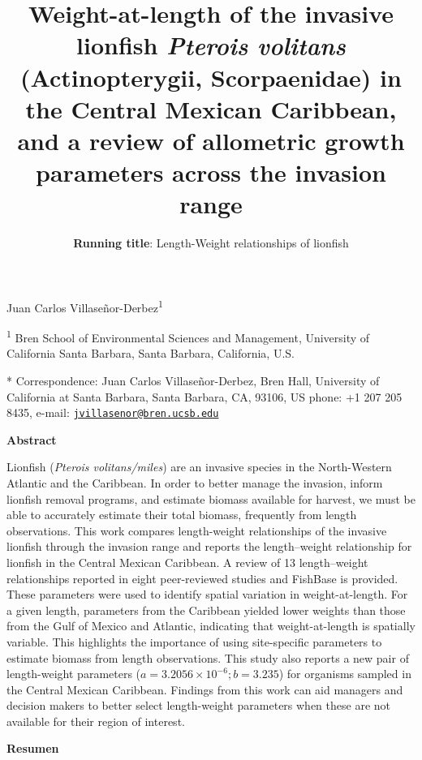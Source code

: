 \documentclass[12pt,]{article}
\title{\Large{Weight-at-length of the invasive lionfish \textit{Pterois volitans} (Actinopterygii, Scorpaenidae) in the Central Mexican Caribbean, and a review of allometric growth parameters across the invasion range}}
\subtitle{\textbf{Running title}: Length-Weight relationships of lionfish}
\author{}
\date{}
\begin{document}
\maketitle

Juan Carlos Villaseñor-Derbez\textsuperscript{1}

\textsuperscript{1} Bren School of Environmental Sciences and
Management, University of California Santa Barbara, Santa Barbara,
California, U.S.

* Correspondence: Juan Carlos Villaseñor-Derbez, Bren Hall, University
of California at Santa Barbara, Santa Barbara, CA, 93106, US phone: +1
207 205 8435, e-mail:
\href{mailto:jvillasenor@bren.ucsb.edu}{\nolinkurl{jvillasenor@bren.ucsb.edu}}

\clearpage

\textbf{Abstract}

Lionfish (\emph{Pterois volitans/miles}) are an invasive species in the
North-Western Atlantic and the Caribbean. In order to better manage the
invasion, inform lionfish removal programs, and estimate biomass
available for harvest, we must be able to accurately estimate their
total biomass, frequently from length observations. This work compares
length-weight relationships of the invasive lionfish through the
invasion range and reports the length--weight relationship for lionfish
in the Central Mexican Caribbean. A review of 13 length--weight
relationships reported in eight peer-reviewed studies and FishBase is
provided. These parameters were used to identify spatial variation in
weight-at-length. For a given length, parameters from the Caribbean
yielded lower weights than those from the Gulf of Mexico and Atlantic,
indicating that weight-at-length is spatially variable. This highlights
the importance of using site-specific parameters to estimate biomass
from length observations. This study also reports a new pair of
length-weight parameters (\(a = 3.2056\times 10^{-6}; b = 3.235\)) for
organisms sampled in the Central Mexican Caribbean. Findings from this
work can aid managers and decision makers to better select length-weight
parameters when these are not available for their region of interest.

\textbf{Resumen}
\end{document}
